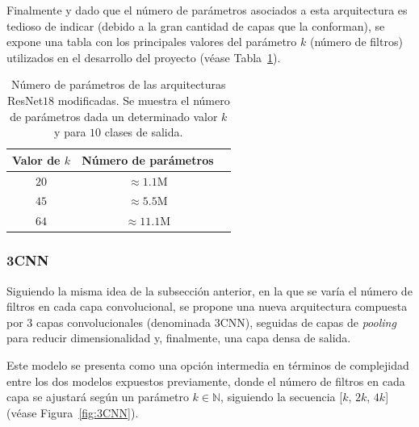 Finalmente y dado que el número de parámetros asociados a esta arquitectura es tedioso de indicar (debido a la gran cantidad de capas que la conforman), se expone una tabla con los principales valores del parámetro $k$ (número de filtros) utilizados en el desarrollo del proyecto (véase Tabla~\ref{tab:numero-parametrosresnet}).\newline

\begin{table}[ht]
    \centering
    \begin{tabular}{|c|c|c|}
    \hline
    \textbf{Valor de $k$}           & \textbf{Número de parámetros}                     
    \\ \hline
    $20$                  & $\approx 1.1$\space M                                            \\ \hline
    $45$                  & $\approx 5.5$\space M                                             \\ \hline
    $64$                  & $\approx 11.1$\space M                                             \\ \hline
    \end{tabular}
    \caption[Número de parámetros de las arquitecturas ResNet$18$ modificadas.]{Número de parámetros de las arquitecturas ResNet$18$ modificadas. Se muestra el número de parámetros dada un determinado valor $k$ y para $10$ clases de salida.}\label{tab:numero-parametrosresnet}
\end{table}

\subsubsection{3CNN}\label{subsubsec:3CNN}

Siguiendo la misma idea de la subsección anterior, en la que se varía el número de filtros en cada capa convolucional, se propone una nueva arquitectura compuesta por $3$ capas convolucionales (denominada $3$CNN), seguidas de capas de \textit{pooling} para reducir dimensionalidad y, finalmente, una capa densa de salida.\newline

Este modelo se presenta como una opción intermedia en términos de complejidad entre los dos modelos expuestos previamente, donde el número de filtros en cada capa se ajustará según un parámetro $k \in \mathbb{N}$, siguiendo la secuencia [$k$, $2k$, $4k$] (véase Figura~\ref{fig:3CNN}).\newline

